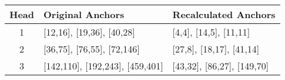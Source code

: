   \begin{tabular}{ c l l }
    \toprule[1.5pt]
    Head       & Original Anchors        & Recalculated Anchors\\
    \midrule
    1          & [12,16], [19,36], [40,28]& [4,4], [14,5], [11,11]\\
    2          & [36,75], [76,55], [72,146]& [27,8], [18,17], [41,14]\\
    3          & [142,110], [192,243], [459,401]& [43,32], [86,27], [149,70]\\
    \bottomrule[1.5pt]
  \end{tabular}